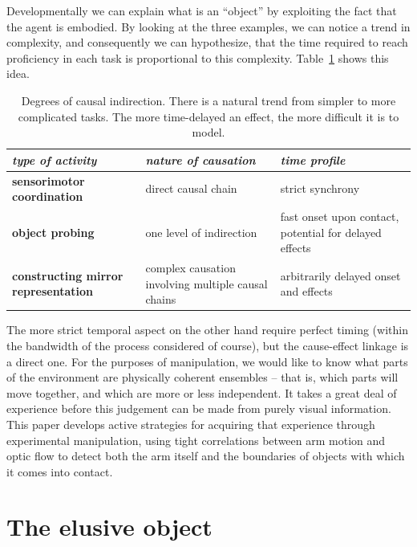 Developmentally we can explain what is an ``object'' by exploiting
the fact that the agent is embodied.
By looking at the three examples, we can notice a trend in complexity, 
and consequently we can hypothesize, that the time required to reach proficiency 
in each task is proportional to this complexity. Table~\ref{tab:causation} shows this idea.
\fi

\begin{table}[htbp]
\begin{center}
\begin{tabular}{|p{5.2cm}|p{4.5cm}|p{4.5cm}|}
\hline
{\it type of activity} & {\it nature of causation} &  {\it time profile} \\ \hline\hline
{\bf sensorimotor coordination} & direct causal chain & strict synchrony \\ \hline
{\bf object probing} & one level of indirection & fast onset upon contact, potential for delayed effects\\ \hline
{\bf constructing mirror representation} &  complex causation involving multiple causal chains & arbitrarily delayed onset and effects\\ \hline
\end{tabular}
\caption{
\label{tab:causation}
%
Degrees of causal indirection. There is a natural
trend from simpler to more complicated tasks.  The more time-delayed
an effect, the more difficult it is to model.
%
}
\end{center}
\end{table}



\ifverbose
The more strict
temporal aspect on the other hand require perfect timing (within the
bandwidth of the process considered of course), but the cause-effect
linkage is a direct one.
For the purposes of manipulation, we would like to know what parts of
the environment are physically coherent ensembles -- that is, which
parts will move together, and which are more or less independent.  It
takes a great deal of experience before this judgement can be made
from purely visual information.  This paper develops active strategies
for acquiring that experience through experimental manipulation, using
tight correlations between arm motion and optic flow to detect both
the arm itself and the boundaries of objects with which it comes into
contact.
\fi

\section{The elusive object}

